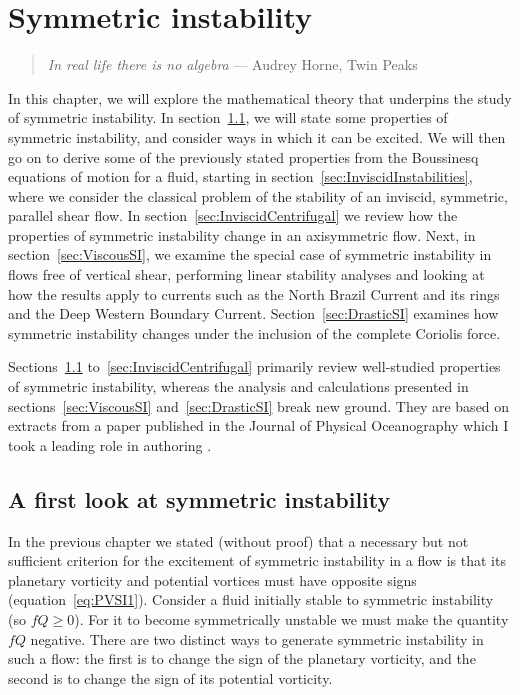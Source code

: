 \chapter{Symmetric instability}
\label{chap:2}
\begin{quote}
    \textit{In real life there is no algebra} --- Audrey Horne, Twin Peaks
\end{quote}

In this chapter, we will explore the mathematical theory that underpins the study of symmetric instability. In section~\ref{sec:FirstLook}, we will state some properties of symmetric instability, and consider ways in which it can be excited. We will then go on to derive some of the previously stated properties from the Boussinesq equations of motion for a fluid, starting in section~\ref{sec:InviscidInstabilities}, where we consider the classical problem of the stability of an inviscid, symmetric, parallel shear flow. In section~\ref{sec:InviscidCentrifugal} we review how the properties of symmetric instability change in an axisymmetric flow. Next, in section~\ref{sec:ViscousSI}, we examine the special case of symmetric instability in flows free of vertical shear, performing linear stability analyses and looking at how the results apply to currents such as the North Brazil Current and its rings and the Deep Western Boundary Current. Section~\ref{sec:DrasticSI} examines how symmetric instability changes under the inclusion of the complete Coriolis force\footnotemark.

Sections~\ref{sec:FirstLook} to~\ref{sec:InviscidCentrifugal} primarily review well-studied properties of symmetric instability, whereas the analysis and calculations presented in sections~\ref{sec:ViscousSI} and~\ref{sec:DrasticSI} break new ground. They are based on extracts from a paper published in the Journal of Physical Oceanography which I took a leading role in authoring \citep{Goldsworth2021}.

\section{A first look at symmetric instability}
\label{sec:FirstLook}
In the previous chapter we stated (without proof) that a necessary but not sufficient criterion for the excitement of symmetric instability in a flow is that its planetary vorticity and potential vortices must have opposite signs (equation~\ref{eq:PVSI1}). Consider a fluid initially stable to symmetric instability (so $fQ \geq 0$). For it to become symmetrically unstable we must make the quantity $fQ$ negative. There are two distinct ways to generate symmetric instability in such a flow: the first is to change the sign of the planetary vorticity, and the second is to change the sign of its potential vorticity.

